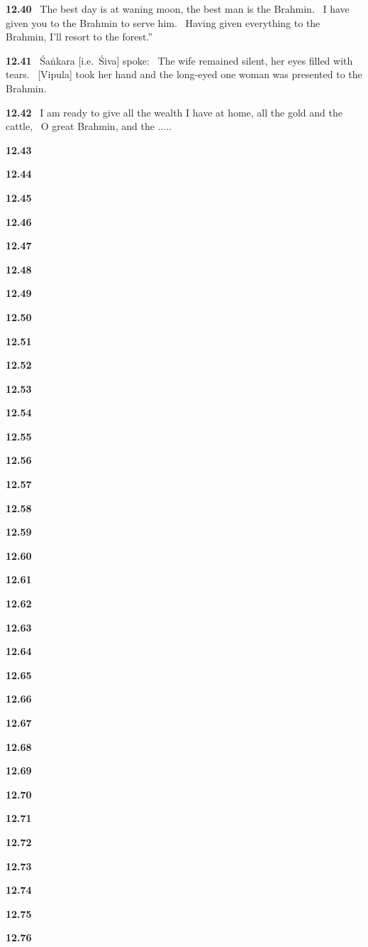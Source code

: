 \documentclass{article}
\begin{document}
\textbf{12.40}%
\ The best day is at waning moon, the best man is the Brahmin.%
\ I have given you to the Brahmin to serve him.%
\ Having given everything to the Brahmin, I'll resort to the forest.''%


\textbf{12.41}%
\ Śaṅkara [i.e.\ Śiva] spoke:%
\ The wife remained silent, her eyes filled with tears.%
\ [Vipula] took her hand and the long-eyed one woman was presented to the Brahmin.%


\textbf{12.42}%
\ I am ready to give all the wealth I have at home, all the gold and the cattle,%
\ O great Brahmin, and the .....%


\textbf{12.43}%


\textbf{12.44}%


\textbf{12.45}%


\textbf{12.46}%


\textbf{12.47}%


\textbf{12.48}%


\textbf{12.49}%


\textbf{12.50}%


\textbf{12.51}%


\textbf{12.52}%


\textbf{12.53}%


\textbf{12.54}%


\textbf{12.55}%


\textbf{12.56}%


\textbf{12.57}%


\textbf{12.58}%


\textbf{12.59}%


\textbf{12.60}%


\textbf{12.61}%


\textbf{12.62}%


\textbf{12.63}%


\textbf{12.64}%


\textbf{12.65}%


\textbf{12.66}%


\textbf{12.67}%


\textbf{12.68}%


\textbf{12.69}%


\textbf{12.70}%


\textbf{12.71}%


\textbf{12.72}%


\textbf{12.73}%


\textbf{12.74}%


\textbf{12.75}%


\textbf{12.76}%
\end{document}
